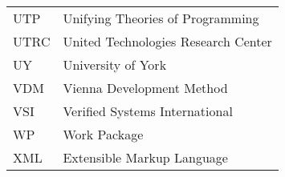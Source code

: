 \begin{longtable}{ll}
UTP     &Unifying Theories of Programming\\
UTRC    & United Technologies Research Center\\
UY      & University of York\\
VDM     &Vienna Development Method\\
VSI     & Verified Systems International\\
WP	&Work Package\\
XML	&Extensible Markup Language\\
\end{longtable}
